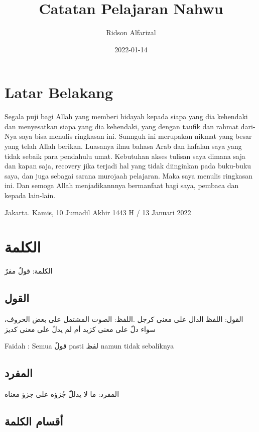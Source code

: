 \documentclass[
]{book}
\title{Catatan Pelajaran Nahwu}
\author{Ridson Alfarizal}
\date{2022-01-14}
\begin{document}
\maketitle

{
\setcounter{tocdepth}{1}
\tableofcontents
}
\hypertarget{latar-belakang}{%
\chapter{Latar Belakang}\label{latar-belakang}}

Segala puji bagi Allah yang memberi hidayah kepada siapa yang dia kehendaki dan menyesatkan siapa yang dia kehendaki, yang dengan taufik dan rahmat dari-Nya saya bisa menulis ringkasan ini. Sunnguh ini merupakan nikmat yang besar yang telah Allah berikan. Luasanya ilmu bahasa Arab dan hafalan saya yang tidak sebaik para pendahulu umat. Kebutuhan akses tulisan saya dimana saja dan kapan saja, recovery jika terjadi hal yang tidak diinginkan pada buku-buku saya, dan juga sebagai sarana murojaah pelajaran. Maka saya menulis ringkasan ini. Dan semoga Allah menjadikannnya bermanfaat bagi saya, pembaca dan kepada lain-lain.

Jakarta. Kamis, 10 Jumadil Akhir 1443 H / 13 Januari 2022

\hypertarget{ux627ux644ux643ux644ux645ux629}{%
\chapter{الكلمة}\label{ux627ux644ux643ux644ux645ux629}}

الكلمة: قولٌ مفرٌ

\hypertarget{ux627ux644ux642ux648ux644}{%
\section{القول}\label{ux627ux644ux642ux648ux644}}

القول: اللفظ الدال على معنى كرجل .اللفظ: الصوت المشتمل على بعض الحروف، سواء دلّ على معنى كزيد أم لم يدلّ على معنى كديز

Faidah : Semua قولٌ pasti لفظ namun tidak sebaliknya

\hypertarget{ux627ux644ux645ux641ux631ux62f}{%
\section{المفرد}\label{ux627ux644ux645ux641ux631ux62f}}

المفرد: ما لا يدللّ جُزؤه على جزؤ معناه

\hypertarget{ux623ux642ux633ux627ux645-ux627ux644ux643ux644ux645ux629}{%
\section{أقسام الكلمة}\label{ux623ux642ux633ux627ux645-ux627ux644ux643ux644ux645ux629}}
\end{document}
